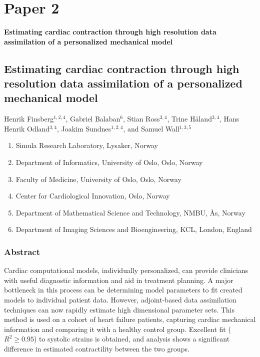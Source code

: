  
\graphicspath{{chapters/paper2/figures/}}


\chapter{Paper 2}
{\Huge \textbf{Estimating cardiac contraction through high resolution data
  assimilation of a personalized mechanical model}}

\newpage
\section*{Estimating cardiac contraction through high resolution data
  assimilation of a personalized mechanical model}

  Henrik Finsberg$^{1,2,4}$,
  Gabriel Balaban$^6$,
  Stian Ross$^{3,4}$,
  Trine H\r{a}land$^{3,4}$,
  Hans Henrik Odland$^{3,4}$,
  Joakim Sundnes$^{1,2,4}$, and
  Samuel Wall$^{1,3,5}$


\footnotesize
\begin{enumerate}[itemsep=-2mm]
\item{Simula Research Laboratory, Lysaker, Norway}
\item{Department of Informatics, University of Oslo, Oslo, Norway}

\item{Faculty of Medicine, University of Oslo, Oslo, Norway}
\item{Center for Cardiological Innovation, Oslo, Norway}
\item{Department of Mathematical Science and Technology, NMBU, \r{A}s,
    Norway}
\item{Department of Imaging Sciences and Bioengineering,
    KCL, London, England}
\end{enumerate}
\normalsize



\subsection*{Abstract}
  
Cardiac computational models, individually personalized, can provide
clinicians with useful diagnostic information and aid in
treatment planning.  A major bottleneck in this process can be  
determining model parameters to fit created models to individual
patient data. However, adjoint-based data assimilation techniques can
now rapidly estimate high dimensional parameter sets.  This method is
used on a cohort of heart failure patients, capturing cardiac mechanical
information and comparing it with a healthy control group.  Excellent
fit ($R^2 \geq 0.95$) to systolic strains is obtained, and analysis
shows a significant difference in estimated contractility between the
two groups.


